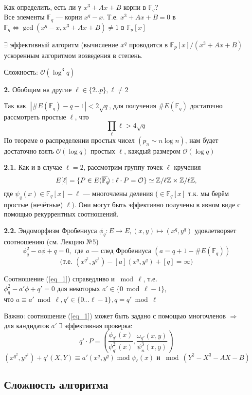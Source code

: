 \documentclass[12pt]{article}
\newcommand{\Z}{{{\mathbb Z}}}
\newcommand{\F}{{{\mathbb F}}}
\newcommand{\bigO}{\mathcal{O}}
\newcommand{\overbar}[1]{\overline{\mkern-0.0mu#1\mkern-4.0mu}}
\theoremstyle{definition}
\theoremstyle{definition}
\theoremstyle{definition}
\begin{document}
Как определить, есть ли у $x^3 + Ax+ B$ корни в $\F_q$?\\
Все элементы $\F_q$ — корни $x^q-x$. Т.е. $x^3+Ax+B=0$ в $\F_q \Leftrightarrow \gcd(x^q - x, x^3+Ax+B) \neq 1$ в $\F_p[x]$

$\exists$ эффективный алгоритм (вычисление $x^q$ проводится в $\F_p[x] / (x^3 + Ax+ B)$ ускоренным алгоритмом возведения в степень.

Сложность: $\bigO(\log^3 q)$


\textbf{2.} Обобщим на другие $\ell \in \{2..p\}, \ell \neq 2$

Так как. $|\#E(\F_q) - q - 1| < 2\sqrt{q}$, для получения $\#E(\F_q)$ достаточно рассмотреть простые $\ell$, что 
\[
    \prod_\ell \ell > 4\sqrt{q}
\]
По теореме о распределении простых чисел $(p_n \sim n \log n)$, нам будет достаточно взять $\bigO(\log q)$ простых $\ell$, каждый размером $\bigO(\log q)$

\textbf{2.1.} Как и в случае $\ell = 2$, рассмотрим группу точек $\ell$-кручения 
\[
    E[\ell] = \{ P \in E(\overbar{\F_q}): \ell\cdot P = \bigO \} \simeq \Z/\ell\Z \times \Z/\ell\Z,
\]
где $\psi_q(x) \in \F_q[x] - \ell$ — многочлены деления ($\in \F_q[x]$ т.к. мы берём простые (нечётные) $\ell$). Они могут быть эффективно получены в явном виде с помощью рекуррентных соотношений.

\textbf{2.2.} Эндоморфизм Фробениуса $\phi_q: E \rightarrow E, (x,y)\mapsto (x^q, y^q)$ удовлетворяет соотношению (см. Лекцию №5)
\begin{equation}
\label{eq_1}
    \phi_q^2 - a\phi + q = 0, \text{ где } a \text{ — след Фробениуса } (a = q+1-\#E(\F_q))
\end{equation}
\[
    \text{(т.е. } (x^{q^2}, y^{q^2}) - [a](x^q, y^q) + [q] = \infty)
\]

Соотношение (\ref{eq_1}) справедливо и $\bmod \ell$, т.е.\\
$\phi_q^2 - a'\phi + q' = 0$ для некоторых $a' \in \{0 \bmod  \ell-1\}$,\\
что $a \equiv a' \bmod \ell, q' \in \{0 \ldots \ell-1\}, q=q' \bmod \ell$

Важно: соотношение (\ref{eq_1}) может быть задано с помощью многочленов $\Rightarrow$ для кандидатов $a'\ \exists$ эффективная проверка:
\[
    q'\cdot P = \left(\frac{\phi_{q'}(x)}{\psi^2_{q'}(x)}, \frac{\omega_{q'}(x,y)}{\psi^3_n(x,y)} \right)
\]
\[
    (x^{q^2}, y^{q^2}) + q'(X,Y) \equiv a'(x^q, y^q) \operatorname{mod} \psi_\ell(x) \text{ и } \bmod  (Y^2-X^3-AX-B)
\]

\subsection{Сложность алгоритма}
\end{document}

